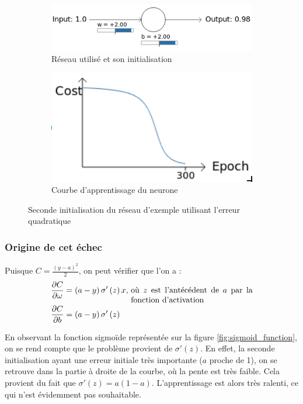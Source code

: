 \begin{figure}[h]
\centering
\begin{subfigure}{.5\textwidth}
  \centering
  \includegraphics[width=.6\linewidth]{img/entropiecroisee_reseau_utilise_init2.png}
  \caption{Réseau utilisé et son initialisation}
  \label{fig:initialisation2-entropiecroisee-schema}
\end{subfigure}%
\begin{subfigure}{.4\textwidth}
  \centering
  \includegraphics[width=.4\linewidth]{img/entropiecroisee_apprentissage2.png}
  \caption{Courbe d'apprentissage du neurone}
  \label{fig:initialisation2-entropiecroisee-courbe}
\end{subfigure}
\caption{Seconde initialisation du réseau d'exemple utilisant l'erreur quadratique}
\label{fig:initialisation2-entropiecroisee}
\end{figure}

\subsubsection{Origine de cet échec}

Puisque $C = \frac{(y-a)^2}{2}$, on peut vérifier que l'on a :
\begin{align}
 \frac{\partial C}{\partial \omega} &= \left(a-y\right)\sigma'\left(z\right)x \text{, \parbox[t]{15em}{où $z$ est l'antécédent de $a$ par la fonction d'activation}}\\
 \frac{\partial C}{\partial b} &= \left(a-y\right)\sigma'\left(z\right) 
\end{align}

En observant la fonction sigmoïde représentée sur la figure \ref{fig:sigmoid_function}, on se rend compte que le problème provient de $\sigma'\left(z\right)$.
En effet, la seconde initialisation ayant une erreur initiale très importante ($a$ proche de 1), on se retrouve dans la partie à droite de la courbe, où la pente est très faible. Cela provient du fait que $\sigma'\left(z\right) = a\left(1-a\right)$.
L'apprentissage est alors très ralenti, ce qui n'est évidemment pas souhaitable.

